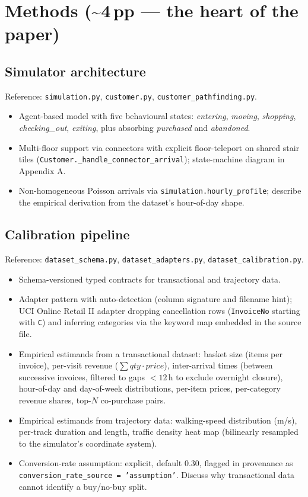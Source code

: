 \documentclass[11pt]{article}
\begin{document}
\section{Methods (\textasciitilde 4\,pp --- the heart of the paper)}

\subsection{Simulator architecture}
Reference: \texttt{simulation.py}, \texttt{customer.py},
\texttt{customer\_pathfinding.py}.
\begin{itemize}[leftmargin=*]
  \item Agent-based model with five behavioural states:
    \emph{entering}, \emph{moving}, \emph{shopping},
    \emph{checking\_out}, \emph{exiting}, plus absorbing
    \emph{purchased} and \emph{abandoned}.
  \item Multi-floor support via connectors with explicit
    floor-teleport on shared stair tiles
    (\texttt{Customer.\_handle\_connector\_arrival}); state-machine
    diagram in Appendix A.
  \item Non-homogeneous Poisson arrivals via
    \texttt{simulation.hourly\_profile}; describe the empirical
    derivation from the dataset's hour-of-day shape.
\end{itemize}

\subsection{Calibration pipeline}
Reference: \texttt{dataset\_schema.py},
\texttt{dataset\_adapters.py}, \texttt{dataset\_calibration.py}.
\begin{itemize}[leftmargin=*]
  \item Schema-versioned typed contracts for transactional and
    trajectory data.
  \item Adapter pattern with auto-detection (column signature and
    filename hint); UCI Online Retail II adapter dropping cancellation
    rows (\texttt{InvoiceNo} starting with \texttt{C}) and inferring
    categories via the keyword map embedded in the source file.
  \item Empirical estimands from a transactional dataset:
    basket size (items per invoice), per-visit revenue
    ($\sum qty \cdot price$), inter-arrival times (between successive
    invoices, filtered to gaps $<12$\,h to exclude overnight closure),
    hour-of-day and day-of-week distributions, per-item prices,
    per-category revenue shares, top-$N$ co-purchase pairs.
  \item Empirical estimands from trajectory data: walking-speed
    distribution (m/s), per-track duration and length, traffic
    density heat map (bilinearly resampled to the simulator's
    coordinate system).
  \item Conversion-rate assumption: explicit, default 0.30, flagged
    in provenance as \texttt{conversion\_rate\_source = 'assumption'}.
    Discuss why transactional data cannot identify a buy/no-buy split.
\end{itemize}
\end{document}
